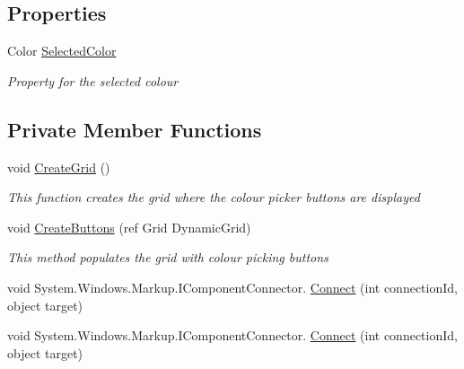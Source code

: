 \subsection*{Properties}
\begin{DoxyCompactItemize}
\item 
Color \hyperlink{class_c_p_u___o_s___simulator_1_1_colour_picker_window_a4e51070f2e58d178bf773acb4200e76e}{Selected\+Color}
\begin{DoxyCompactList}\small\item\em Property for the selected colour \end{DoxyCompactList}\end{DoxyCompactItemize}
\subsection*{Private Member Functions}
\begin{DoxyCompactItemize}
\item 
void \hyperlink{class_c_p_u___o_s___simulator_1_1_colour_picker_window_aed4e40744fb046fb84cebd2c406b8a99}{Create\+Grid} ()
\begin{DoxyCompactList}\small\item\em This function creates the grid where the colour picker buttons are displayed \end{DoxyCompactList}\item 
void \hyperlink{class_c_p_u___o_s___simulator_1_1_colour_picker_window_a2969d055fb398db5c470dd91d89abffd}{Create\+Buttons} (ref Grid Dynamic\+Grid)
\begin{DoxyCompactList}\small\item\em This method populates the grid with colour picking buttons \end{DoxyCompactList}\item 
void System.\+Windows.\+Markup.\+I\+Component\+Connector. \hyperlink{class_c_p_u___o_s___simulator_1_1_colour_picker_window_a857b5ab5ebf06a29846e0595c3c442ad}{Connect} (int connection\+Id, object target)
\item 
void System.\+Windows.\+Markup.\+I\+Component\+Connector. \hyperlink{class_c_p_u___o_s___simulator_1_1_colour_picker_window_a857b5ab5ebf06a29846e0595c3c442ad}{Connect} (int connection\+Id, object target)
\end{DoxyCompactItemize}
